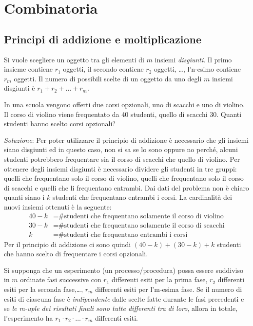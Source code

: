 \chapter{Combinatoria}
\section{Principi di addizione e moltiplicazione}

\begin{defn}
	Si vuole scegliere un oggetto tra gli elementi di $m$ insiemi \emph{disgiunti}.
	Il primo insieme contiene $r_1$ oggetti, il secondo contiene $r_2$ oggetti, \dots, 
	l'n-esimo contiene $r_m$ oggetti. Il numero di possibili scelte di un oggetto da 
	uno degli $m$ insiemi disgiunti è $r_1 + r_2 + \dots + r_m$.
\end{defn}

\begin{ese}
	In una scuola vengono offerti due corsi opzionali, uno di scacchi e uno di violino.
	Il corso di violino viene frequentato da 40 studenti, quello di scacchi 30.
	Quanti studenti hanno scelto corsi  opzionali?
	
	\emph{Soluzione}:
	Per poter utilizzare il principio di addizione è necessario che gli insiemi siano
	disgiunti ed in questo caso, non si sa se lo sono oppure no perché, alcuni studenti
	potrebbero frequentare sia il corso di scacchi che quello di violino. 
	Per ottenere degli insiemi disgiunti è necessario dividere gli studenti in tre gruppi:
	quelli che frequentano solo il corso di violino, quelli che frequentano solo il corso
	di scacchi e quelli che li frequentano entrambi. Dai dati del problema non è chiaro 
	quanti siano i $k$ studenti che frequentano entrambi i corsi. La cardinalità dei nuovi
	insiemi ottenuti è la seguente:	
	\begin{align*}
		40 - k &= \text{\# studenti che frequentano solamente il corso di violino}\\
		30 - k &= \text{\# studenti che frequentano solamente il corso di scacchi}\\
		k &= \text{\# studenti che frequentano entrambi i corsi}
	\end{align*}
	Per il principio di addizione ci sono quindi $(40 - k) + (30 - k) + k$ studenti che
	hanno scelto di frequentare i corsi opzionali.
	\QEDA
\end{ese}

\begin{defn}
	Si supponga che un esperimento (un processo/procedura) possa essere suddiviso in
	$m$ ordinate fasi successive con $r_1$ differenti esiti per la prima fase,
	$r_2$ differenti esiti per la seconda fase,\dots, $r_m$ differenti esiti per
	l'm-esima fase. Se il numero di esiti di ciascuna fase è \emph{indipendente} dalle
	scelte fatte durante le fasi precedenti e se \emph{le m-uple dei risultati finali 
	sono tutte differenti tra di loro}, allora in totale, l'esperimento ha 
	$r_1 \cdot r_2 \cdot \ldots \cdot r_m$ differenti esiti.
\end{defn}

